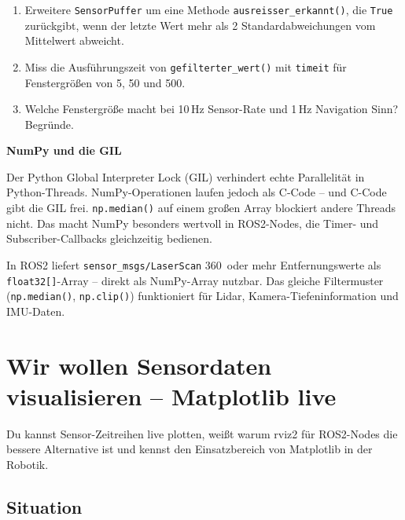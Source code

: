 \begin{uebungBox}
\begin{enumerate}
\item Erweitere \texttt{SensorPuffer} um eine Methode \texttt{ausreisser\_erkannt()},
  die \texttt{True} zurückgibt, wenn der letzte Wert mehr als 2 Standardabweichungen
  vom Mittelwert abweicht.
\item Miss die Ausführungszeit von \texttt{gefilterter\_wert()} mit \texttt{timeit}
  für Fenstergrößen von 5, 50 und 500.
\item Welche Fenstergröße macht bei 10\,Hz Sensor-Rate und 1\,Hz Navigation Sinn?
  Begründe.
\end{enumerate}
\end{uebungBox}

\begin{haubeBox}
\textbf{NumPy und die GIL}

Der Python Global Interpreter Lock (GIL) verhindert echte
Parallelität in Python-Threads. NumPy-Operationen laufen
jedoch als C-Code -- und C-Code gibt die GIL frei.
\texttt{np.median()} auf einem großen Array blockiert andere Threads nicht.
Das macht NumPy besonders wertvoll in ROS2-Nodes,
die Timer- und Subscriber-Callbacks gleichzeitig bedienen.
\end{haubeBox}

\begin{robotikBox}
In ROS2 liefert \texttt{sensor\_msgs/LaserScan} 360~oder mehr Entfernungswerte
als \texttt{float32[]}-Array -- direkt als NumPy-Array nutzbar.
Das gleiche Filtermuster (\texttt{np.median()}, \texttt{np.clip()})
funktioniert für Lidar, Kamera-Tiefeninformation und IMU-Daten.
\end{robotikBox}


\chapter{Wir wollen Sensordaten visualisieren – Matplotlib live}

\begin{lernziele}
Du kannst Sensor-Zeitreihen live plotten,
weißt warum rviz2 für ROS2-Nodes die bessere Alternative ist
und kennst den Einsatzbereich von Matplotlib in der Robotik.
\end{lernziele}

\section{Situation}

